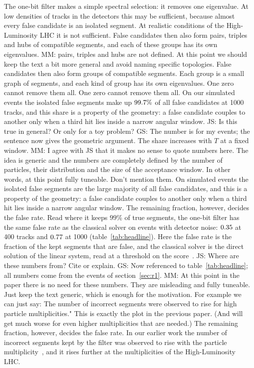 \documentclass[11pt,a4paper]{article}
\newcommand{\js}[1]{{\color{blue} JS: #1 }}
\newcommand{\mm}[1]{{\color{purple} MM: #1 }}
\newcommand{\gs}[1]{{\color{orange!85!black} GS: #1 }}
\newcommand{\gss}[1]{{\color{teal} #1}}
\begin{document}
The one-bit filter makes a simple spectral selection: it removes one eigenvalue. At low densities of tracks in the detectors
this may be sufficient, because almost every false candidate is an isolated segment. At realistic conditions of the
High-Luminosity LHC it is not sufficient. False candidates then also form pairs, triples and hubs of
compatible segments, and each of these groups has its own eigenvalues. \mm{pairs, triples and hubs are not defined. At this point we should keep the text a bit more general and avoid naming specific topologies.} \gss{False candidates then also form groups of compatible segments. Each group is a small graph of segments, and each kind of group has its own eigenvalues. One zero cannot remove them all.} One zero cannot remove them
all. On our simulated events the isolated false segments make up $99.7\%$ of all false
candidates at 1000 tracks, and this share is a property of the geometry: a false candidate couples
to another only when a third hit lies inside a narrow angular window. \js{Is this true in general? Or only for a toy problem?} \gs{The number is for my events; the sentence now gives the geometric argument. The share increases with $T$ at a fixed window.} 
\mm{I agree with JS that it makes no sense to quote numbers here. The idea is generic and the numbers are completely defined by the number of particles, their distribution  and the size of the acceptance window. In other words, at this point fully tuneable. Don't mention them.} \gss{On simulated events the isolated false segments are the large majority of all false candidates, and this is a property of the geometry: a false candidate couples to another only when a third hit lies inside a narrow angular window.}
The
remaining fraction, however, decides the false rate. Read where it keeps $99\%$ of true segments,
the one-bit filter has the same false rate as the classical solver on events with detector noise:
$0.35$ at 400 tracks and $0.77$ at 1000 (table~\ref{tab:headline}).
Here the false rate is the fraction of the kept segments that are false, and the classical solver
is the direct solution of the linear system, read at a threshold on the score~\cite{nicotra2023,trackhhl}.
\js{Where are these numbers from? Cite or explain.} \gs{Now referenced to table~\ref{tab:headline}; all numbers come from the events of section~\ref{sec:r1}.}
\mm{At this point in the paper there is no need for these numbers. They are misleading and fully tuneable. Just keep the text generic, which is enough for the motivation. For example we can just say: The number of incorrect segments were observed to rise for high particle multiplicities." This is exactly the plot in the previous paper. (And will get much worse for even higher multiplicities that are needed.)} \gss{The remaining fraction, however, decides the false rate. In our earlier work the number of incorrect segments kept by the filter was observed to rise with the particle multiplicity~\cite{trackhhl}, and it rises further at the multiplicities of the High-Luminosity LHC.}
\end{document}
